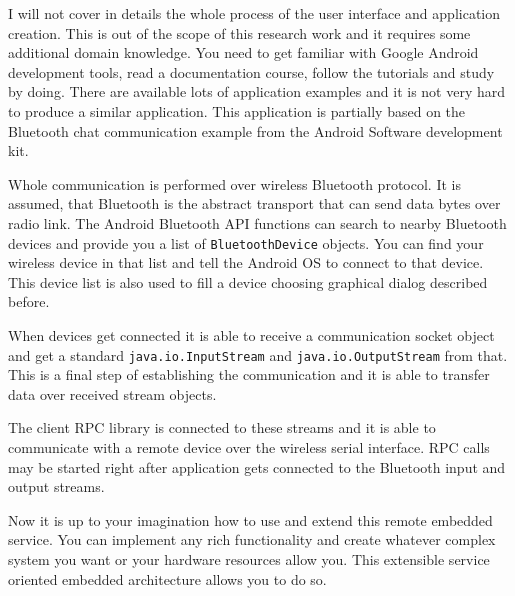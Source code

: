 I will not cover in details the whole process of the user interface and application creation.
This is out of the scope of this research work and it requires some additional domain knowledge. 
You need to get familiar with Google Android development tools,
read a documentation course, follow the tutorials and study by doing.
There are available lots of application examples and it is not very hard to produce a similar application.
This application is partially based on the Bluetooth chat communication example from the Android Software development kit.

Whole communication is performed over wireless Bluetooth protocol.
It is assumed, that Bluetooth is the abstract transport that can send data bytes over radio link.
The Android Bluetooth API functions can search to nearby Bluetooth devices and provide you a list of \texttt{BluetoothDevice} objects.
You can find your wireless device in that list and tell the Android OS to connect to that device. 
This device list is also used to fill a device choosing graphical dialog described before.

When devices get connected  it is able to receive a communication socket object and get a standard \texttt{java.io.InputStream} and \texttt{java.io.OutputStream} from that.
This is a final step of establishing the communication and it is able to transfer data over received stream objects.


The client RPC library is connected to these streams and it is able to communicate with a remote device over the wireless serial interface.
RPC calls may be started right after application gets connected to the Bluetooth input and output streams.


Now it is up to your imagination how to use and extend this remote embedded service.
You can implement any rich functionality and create whatever complex system you want or your hardware resources allow you.
This extensible service oriented embedded architecture allows you to do so.
